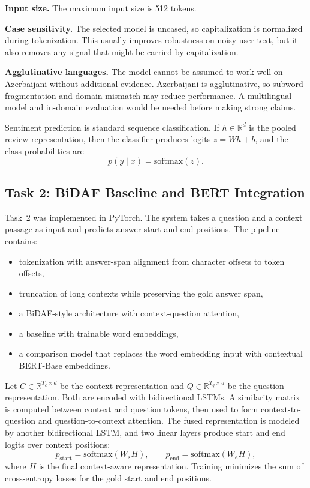 \documentclass[10pt]{article}
\begin{document}
\textbf{Input size.} The maximum input size is 512 tokens.

\textbf{Case sensitivity.} The selected model is uncased, so capitalization is normalized during tokenization. This usually improves robustness on noisy user text, but it also removes any signal that might be carried by capitalization.

\textbf{Agglutinative languages.} The model cannot be assumed to work well on Azerbaijani without additional evidence. Azerbaijani is agglutinative, so subword fragmentation and domain mismatch may reduce performance. A multilingual model and in-domain evaluation would be needed before making strong claims.

Sentiment prediction is standard sequence classification. If $h \in \mathbb{R}^{d}$ is the pooled review representation, then the classifier produces logits $z = Wh + b$, and the class probabilities are
\[
p(y \mid x) = \mathrm{softmax}(z).
\]

\subsection{Task 2: BiDAF Baseline and BERT Integration}
Task~2 was implemented in PyTorch. The system takes a question and a context passage as input and predicts answer start and end positions. The pipeline contains:
\begin{itemize}
\item tokenization with answer-span alignment from character offsets to token offsets,
\item truncation of long contexts while preserving the gold answer span,
\item a BiDAF-style architecture with context-question attention,
\item a baseline with trainable word embeddings,
\item a comparison model that replaces the word embedding input with contextual BERT-Base embeddings.
\end{itemize}

Let $C \in \mathbb{R}^{T_c \times d}$ be the context representation and $Q \in \mathbb{R}^{T_q \times d}$ be the question representation. Both are encoded with bidirectional LSTMs. A similarity matrix is computed between context and question tokens, then used to form context-to-question and question-to-context attention. The fused representation is modeled by another bidirectional LSTM, and two linear layers produce start and end logits over context positions:
\[
p_{\text{start}} = \mathrm{softmax}(W_s H), \qquad
p_{\text{end}} = \mathrm{softmax}(W_e H),
\]
where $H$ is the final context-aware representation. Training minimizes the sum of cross-entropy losses for the gold start and end positions.
\end{document}
